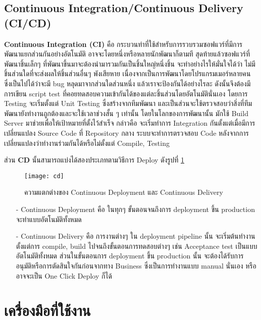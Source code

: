     \subsection{Continuous Integration/Continuous Delivery (CI/CD)}
    \textbf{Continuous Integration (CI)} คือ กระบวนท่าที่ใช้สำหรับการรวบรวมซอฟแวร์ที่มีการพัฒนาแยกส่วนกันอย่างอัตโนมัติ อาจจะโดยหนึ่งหรือหลายนักพัฒนาก็ตามที สุดท้ายแล้วซอฟแวร์ที่พัฒนาชิ้นเล็กๆ ที่พัฒนาขึ้นมาจะต้องนำมารวมกันเป็นชิ้นใหญ่หนึ่งชิ้น จะทำอย่างไรให้มั่นใจได้ว่า ไม่มีชิ้นส่วนใดที่จะส่งผลให้ชิ้นส่วนอื่นๆ พังเสียหาย เนื่องจากเป็นการพัฒนาโดยโปรแกรมเมอร์หลายคน
    ซึ่งเป็นไปได้ว่าจะมี bug หลุดมาจากส่วนใดส่วนหนึ่ง แล้วเราจะป้องกันได้อย่างไรละ ดังนั้นจึงต้องมีการเขียน script test ที่คอยทดสอบความเข้ากันได้ของแต่ละชิ้นส่วนโดยอัตโนมัตินั่นเอง โดยการ Testing จะเริ่มตั้งแต่ Unit Testing ซึ่งสร้างจากทีมพัฒนา และเป็นส่วนจะใช้ตรวจสอบว่าสิ่งที่ทีมพัฒนายังทำงานถูกต้องและจะใช้เวลาช่วงสั้น ๆ เท่านั้น
    โดยในโลกของการพัฒนานั้น มักใช้ Build Server มาช่วยเพื่อให้เป้าหมายที่ตั้งไว้สำเร็จ กล่าวคือ จะเริ่มทำการ Integration กันตั้งแต่เมื่อมีการเปลี่ยนแปลง Source Code ที่ Repository กลาง ระบบจะทำการตรวจสอบ Code หลังจากการเปลี่ยนแปลงว่าทำงานร่วมกันได้หรือไม่ตั้งแต่ Compile, Testing
    
    ส่วน \textbf{CD} นั้นสามารถแบ่งได้สองประเภทตามวิธีการ Deploy ดังรูปที่ \ref{cd}
    \begin{figure}[H]
        \centering
        \texttt{[image: cd]}
        \caption{ความแตกต่างของ Continuous Deployment และ Continuous Delivery }\label{cd}
    \end{figure}
    \begin{itemize}
        \item[-] Continuous Deployment คือ ในทุกๆ ขั้นตอนจนถึงการ deployment ขึ้น production จะทำแบบอัตโนมัติทั้งหมด
        \item[-] Continuous Delivery คือ การงานต่างๆ ใน deployment pipeline นั้น จะเริ่มต้นทำงานตั้งแต่การ compile, build ไปจนถึงขั้นตอนการทดสอบต่างๆ เช่น Acceptance test เป็นแบบอัตโนมัติทั้งหมด ส่วนในขั้นตอนการ deployment ขึ้น production นั้น จะต้องได้รับการอนุมัติหรือการตัดสินใจกันก่อนจากทาง Business ซึ่งเป็นการทำงานแบบ manual นั่นเอง หรืออาจจะเป็น One Click Deploy ก็ได้\cite{cicd}
    \end{itemize}

\section{เครื่องมือที่ใช้งาน}

